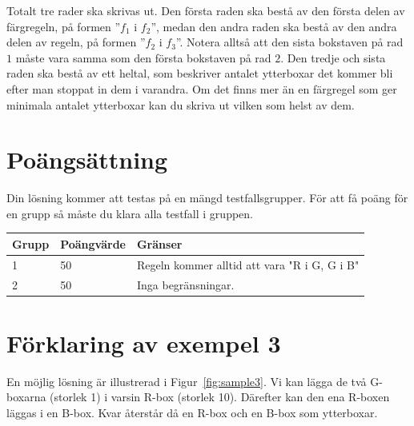 Totalt tre rader ska skrivas ut. Den första raden ska bestå av den första delen
av färgregeln, på formen ''$f_1$ i $f_2$'', medan den andra raden ska bestå av 
den andra delen av regeln, på formen ''$f_2$ i $f_3$''. Notera alltså att den sista bokstaven på
rad $1$ måste vara samma som den första bokstaven på rad $2$.
Den tredje och sista raden ska bestå av ett heltal, som beskriver antalet ytterboxar det kommer bli
efter man stoppat in dem i varandra. Om det finns mer än en färgregel 
som ger minimala antalet ytterboxar kan du skriva ut vilken som helst av dem.

\section*{Poängsättning}
Din lösning kommer att testas på en mängd testfallsgrupper. För att få poäng för en grupp
så måste du klara alla testfall i gruppen.

\noindent
\begin{tabular}{| l | l | l |}
\hline
Grupp & Poängvärde & Gränser \\ \hline
1     & 50         & Regeln kommer alltid att vara "R i G, G i B" \\ \hline
2     & 50         & Inga begränsningar. \\ \hline
\end{tabular}

\section*{Förklaring av exempel 3}
En möjlig lösning är illustrerad i Figur~\ref{fig:sample3}.
Vi kan lägga de två G-boxarna (storlek 1) i varsin R-box (storlek 10).
Därefter kan den ena R-boxen läggas i en B-box.
Kvar återstår då en R-box och en B-box som ytterboxar.
